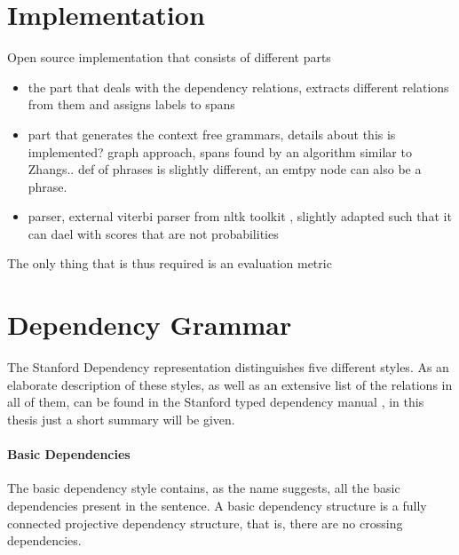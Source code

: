 \documentclass{report}
\theoremstyle{definition}
\theoremstyle{plain}
\begin{document}
\section{Implementation}

Open source implementation that consists of different parts

\begin{itemize}
\item the part that deals with the dependency relations, extracts different relations from them and assigns labels to spans
\item part that generates the context free grammars, details about this is implemented? graph approach, spans found by an algorithm similar to Zhangs.. def of phrases is slightly different, an emtpy node can also be a phrase.
\item parser, external viterbi parser from nltk toolkit \citep{bird2009natural}, slightly adapted such that it can dael with scores that are not probabilities 
\end{itemize}

The only thing that is thus required is an evaluation metric





\section{Dependency Grammar}




The Stanford Dependency representation distinguishes five different styles. As an elaborate description of these styles, as well as an extensive list of the relations in all of them, can be found in the Stanford typed dependency manual \citep{de2008stanford}, in this thesis just a short summary will be given.
\paragraph{Basic Dependencies} The basic dependency style contains, as the name suggests, all the basic dependencies present in the sentence. A basic dependency structure is a fully connected projective dependency structure, that is, there are no crossing dependencies.
\end{document}
